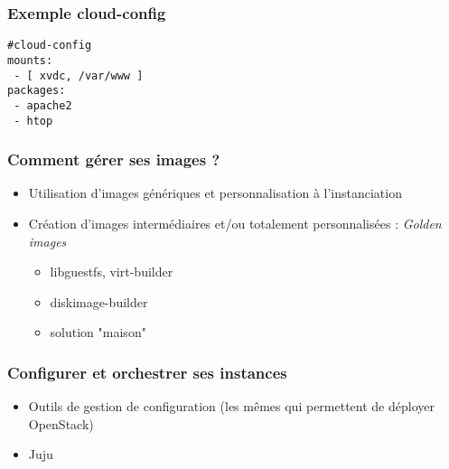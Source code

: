   \begin{frame}[containsverbatim]
    \frametitle{Exemple cloud-config}
\begin{verbatim}
#cloud-config
mounts:
 - [ xvdc, /var/www ]
packages:
 - apache2
 - htop
\end{verbatim}
  \end{frame}

  \begin{frame}
    \frametitle{Comment gérer ses images ?}
    \begin{itemize}
      \item Utilisation d'images génériques et personnalisation à l'instanciation
      \item Création d'images intermédiaires et/ou totalement personnalisées : \textit{Golden images}
      \begin{itemize}
        \item libguestfs, virt-builder
        \item diskimage-builder
        \item solution "maison"
      \end{itemize}
    \end{itemize}
  \end{frame}

  \begin{frame}
    \frametitle{Configurer et orchestrer ses instances}
    \begin{itemize}
      \item Outils de gestion de configuration (les mêmes qui permettent de déployer OpenStack)
      \item Juju
    \end{itemize}
  \end{frame}
